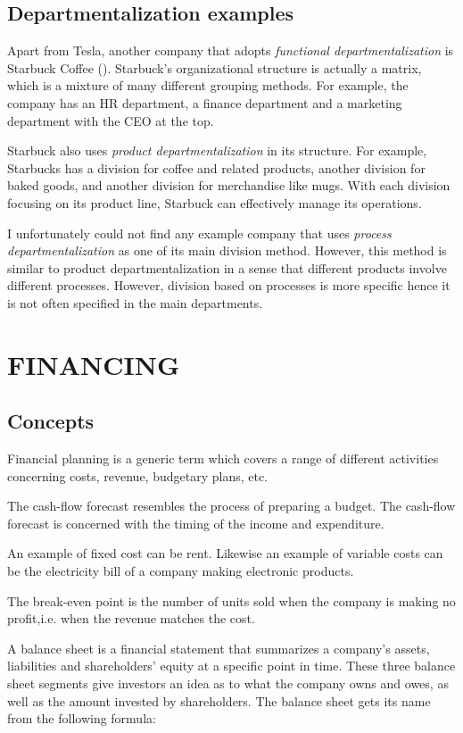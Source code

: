 \documentclass[12pt]{article}
\begin{document}
\subsection{Departmentalization examples}

Apart from Tesla, another company that adopts \textit{functional departmentalization} is Starbuck Coffee (\cite{me17c}). Starbuck's organizational structure is actually a matrix, which is a mixture of many different grouping methods. For example, the company has an HR department, a finance department and a marketing department with the CEO at the top.

Starbuck also uses \textit{product departmentalization} in its structure. For example, Starbucks has a division for coffee and related products, another division for baked goods, and another division for merchandise like mugs. With each division focusing on its product line, Starbuck can effectively manage its operations.

I unfortunately could not find any example company that uses \textit{process departmentalization} as one of its main division method. However, this method is similar to product departmentalization in a sense that different products involve different processes. However, division based on processes is more specific hence it is not often specified in the main departments.

\section{FINANCING}

\subsection{Concepts}

Financial planning is a generic term which covers a range of different activities concerning costs, revenue, budgetary plans, etc.

The cash-flow forecast resembles the process of preparing a budget. The cash-flow forecast is concerned with the timing of the income and expenditure.

An example of fixed cost can be rent. Likewise an example of variable costs can be the electricity bill of a company making electronic products.

The break-even point is the number of units sold when the company is making no profit,i.e. when the revenue matches the cost.

A balance sheet is a financial statement that summarizes a company's assets, liabilities and shareholders' equity at a specific point in time. These three balance sheet segments give investors an idea as to what the company owns and owes, as well as the amount invested by shareholders. The balance sheet gets its name from the following formula:
\end{document}
